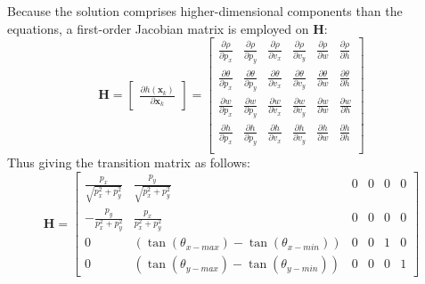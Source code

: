 Because the solution comprises higher-dimensional components than the equations, 
a first-order Jacobian matrix is employed on $\mathbf{H}$: 
\begingroup
        \large
        \begin{equation}
            \mathbf{H}=
            \begin{bmatrix}
                \frac{\partial h(\mathbf{x}_k)}{\partial \mathbf{x}_k}
            \end{bmatrix}=
            \begin{bmatrix}
                \frac{\partial \rho}{\partial p_x} & \frac{\partial \rho}{\partial p_y}
                & \frac{\partial \rho}{\partial v_x}& \frac{\partial \rho}{\partial v_y} 
                & \frac{\partial \rho}{\partial w}& \frac{\partial \rho}{\partial h}\\
        
                \frac{\partial \theta}{\partial p_x} & \frac{\partial \theta}{\partial p_y} 
                & \frac{\partial \theta}{\partial v_x}& \frac{\partial \theta}{\partial v_y} 
                & \frac{\partial \theta}{\partial w}& \frac{\partial \theta}{\partial h} \\

                \frac{\partial w}{\partial p_x} & \frac{\partial w}{\partial p_y} 
                & \frac{\partial w}{\partial v_x}& \frac{\partial w}{\partial v_y} 
                & \frac{\partial w}{\partial w}& \frac{\partial w}{\partial h} \\

                \frac{\partial h}{\partial p_x} & \frac{\partial h}{\partial p_y} 
                & \frac{\partial h}{\partial v_x}& \frac{\partial h}{\partial v_y} 
                & \frac{\partial h}{\partial w}& \frac{\partial h}{\partial h} \\
            \end{bmatrix}
        \end{equation}
    Thus giving the transition matrix as follows:    
    \begin{equation}
            \mathbf{H}=
            \begin{bmatrix}
                \frac{p_x}{\sqrt{p_x^2+p_y^2}} & \frac{p_y}{\sqrt{p_x^2+p_y^2}} & 0 & 0 & 0 & 0\\
                -\frac{p_y}{p_x^2+p_y^2} & \frac{p_x}{p_x^2+p_y^2} & 0 & 0 & 0 & 0\\
                0 & (\tan(\theta_{x-max}) - \tan(\theta_{x-min})) & 0 & 0 & 1 & 0\\
                0 & (\tan(\theta_{y-max}) - \tan(\theta_{y-min})) & 0 & 0 & 0 & 1
            \end{bmatrix}
        \end{equation}
    \endgroup